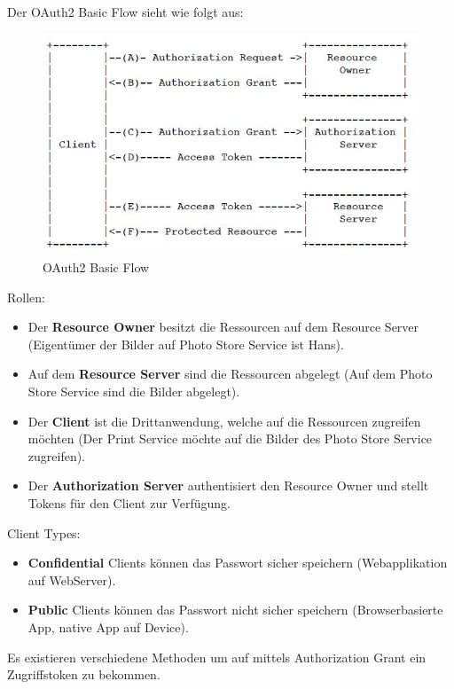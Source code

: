 Der OAuth2 Basic Flow sieht wie folgt aus:
\begin{figure}[h!]
\centering
\includegraphics[width=0.7\linewidth]{fig/oauth2flow}
\caption{OAuth2 Basic Flow}
\label{fig:oauth2flow}
\end{figure}

Rollen:
\begin{itemize}
	\item Der \textbf{Resource Owner} besitzt die Ressourcen auf dem Resource Server (Eigentümer der Bilder auf Photo Store Service ist Hans).
	
	\item Auf dem \textbf{Resource Server} sind die Ressourcen abgelegt (Auf dem Photo Store Service sind die Bilder abgelegt).
	
	\item Der \textbf{Client} ist die Drittanwendung, welche auf die Ressourcen zugreifen möchten (Der Print Service möchte auf die Bilder des Photo Store Service zugreifen).
	
	\item Der \textbf{Authorization Server} authentisiert den Resource Owner und stellt Tokens für den Client zur Verfügung.
\end{itemize}

Client Types:
\begin{itemize}
	\item \textbf{Confidential} Clients können das Passwort sicher speichern (Webapplikation auf WebServer).
	
	\item \textbf{Public} Clients können das Passwort nicht sicher speichern (Browserbasierte App, native App auf Device).
\end{itemize}

\newpage

Es existieren verschiedene Methoden um auf mittels Authorization Grant ein Zugriffstoken zu bekommen.

